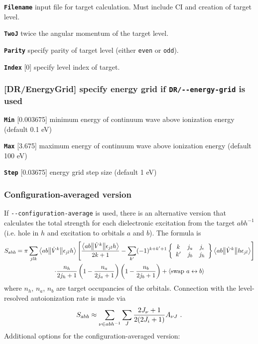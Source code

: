 \documentclass[a4paper,11pt]{article}
\newcommand{\option}[1]{\smallskip\noindent\textbf{\texttt{#1}}}
\newcommand{\code}[1]{\texttt{#1}}
\begin{document}
\option{Filename} input file for target calculation. Must include CI and creation of target level.

\option{TwoJ} twice the angular momentum of the target level.

\option{Parity} specify parity of target level (either \code{even} or \code{odd}).

\option{Index} [0] specify level index of target.

\subsubsection{[DR/EnergyGrid] specify energy grid if \code{DR/-{}-energy-grid} is used}

\option{Min} [0.003675] minimum energy of continuum wave above ionization energy (default 0.1 eV)

\option{Max} [3.675] maximum energy of continuum wave above ionization energy (default 100 eV)

\option{Step} [0.03675] energy grid step size (default 1 eV)

\subsubsection{Configuration-averaged version}
If \texttt{-{}-configuration-average} is used, there is an alternative version that calculates the total strength for each dielectronic excitation from the target $a b h^{-1}$ (i.e. hole in $h$ and excitation to orbitals $a$ and $b$).
The formula is
\begin{multline}
\nonumber
S_\textsl{abh} = \pi \sum_{j l k} \big< a b \big\Vert \hat V^k \big\Vert \epsilon_{j l} h\big> 
	\left[ \frac{\big< a b \big\Vert \hat V^k \big\Vert \epsilon_{j l} h \big>}{2k+1}
	- \sum_{k'} (-1)^{k+k'+1} \left\{ \begin{array}{ccc} k & j_a & j_\epsilon \\ k' & j_b & j_h \end{array} \right\}
	\big< a b \big\Vert \hat V^k \big\Vert h \epsilon_{j l} \big> \right]\\
	\cdot \frac{n_h}{2 j_h + 1} \left(1 - \frac{n_a}{2 j_a + 1} \right) \left(1 - \frac{n_b}{2 j_b + 1} \right)
	+ \left< \textrm{swap}\ a \leftrightarrow b \right>
\end{multline}
where $n_h$, $n_a$, $n_b$ are target occupancies of the orbitals.
Connection with the level-resolved autoionization rate is made via
\[
S_\textsl{abh} \approx \sum_{\nu \in abh^{-1}} \sum_J \frac{2J_\nu + 1}{2 (2J_i + 1)} A_{\nu J} \ .
\]
Additional options for the configuration-averaged version:
\end{document}
